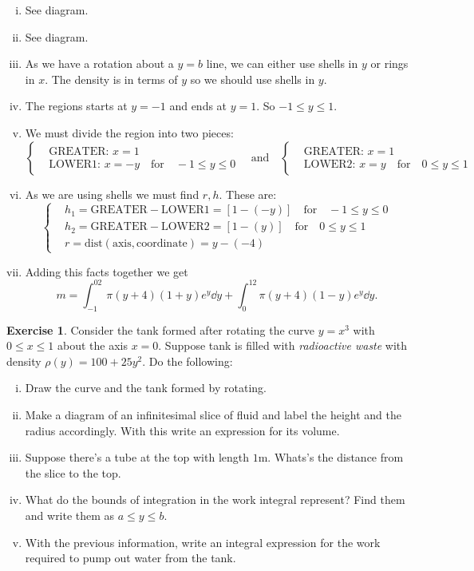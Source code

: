 \documentclass[12pt]{article}
\theoremstyle{plain}
\theoremstyle{definition}
\newtheorem{Ej}[Th]{Exercise}         %
\theoremstyle{remark}
\renewcommand{\leq}{\leqslant}      %
\renewcommand{\:}{\colon}           %
\renewcommand{\.}{\Cdot}                %
\begin{document}
\begin{ptcb}
\begin{enumerate}[i)]
  \itemsep=-0.4em 
  \item See diagram.
  \item See diagram.\vspace{2cm}
  \item As we have a rotation about a $y=b$ line, we can either use shells in $y$ or rings in $x$. The density is in terms of $y$ so we should use shells in $y$.
  \item The regions starts at $y=-1$ and ends at $y=1$. So $-1\leq y\leq 1$.
  \item We must divide the region into two pieces:
  $$
  \left\lbrace
  \begin{aligned}
    &\text{GREATER: } x=1\\
    &\text{LOWER1: } x=-y\quad\text{for}\quad-1\leq y\leq 0
  \end{aligned}
  \right.
  \quad\text{and}\quad
  \left\lbrace
  \begin{aligned}
    &\text{GREATER: } x=1\\
    &\text{LOWER2: } x=y\quad\text{for}\quad 0\leq y\leq 1
  \end{aligned}
  \right.
  $$
  \item As we are using shells we must find $r,h$. These are:
  $$  \left\lbrace
  \begin{aligned}
    & h_1=\text{GREATER}-\text{LOWER1}=[1-(-y)]\quad\text{for}\quad -1\leq y\leq 0\\
    & h_2=\text{GREATER}-\text{LOWER2}=[1-(y)]\quad\text{for}\quad 0\leq y\leq 1\\
    & r=\text{dist}(\text{axis},\text{coordinate})=y-(-4)
  \end{aligned}
  \right.
  $$
  \item Adding this facts together we get 
  $$m=\int_{-1}^02\pi(y+4)(1+y)e^y\dd y+\int_0^12\pi(y+4)(1-y)e^y\dd y.$$
\end{enumerate}
\end{ptcb}
\newpage
\begin{Ej}
 Consider the tank formed after rotating the curve $y=x^3$ with $0\leq x\leq 1$ about the axis $x=0$. Suppose tank is filled with \emph{radioactive waste} with density $\rho(y)=100+25y^2$. Do the following:
 \begin{enumerate}[i)]
  \itemsep=-0.4em 
  \item Draw the curve and the tank formed by rotating.
  \item Make a diagram of an infinitesimal slice of fluid and label the height and the radius accordingly. With this write an expression for its volume.
  \item Suppose there's a tube at the top with length $1\si{\metre}$. Whats's the distance from the slice to the top. 
  \item What do the bounds of integration in the work integral represent? Find them and write them as $a\leq y\leq b$.
  \item With the previous information, write an integral expression for the work required to pump out water from the tank.
 \end{enumerate}
\end{Ej}
\end{document}
